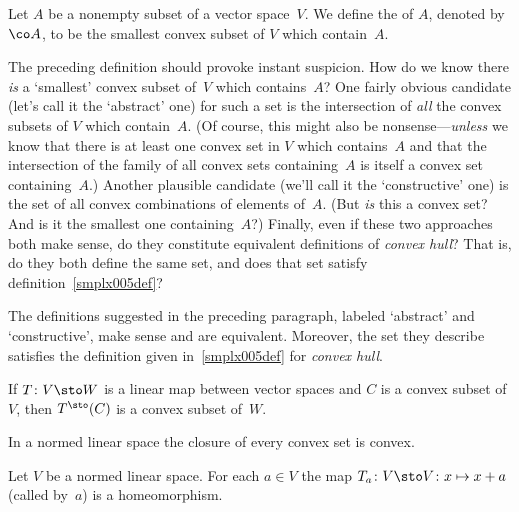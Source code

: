 \begin{defn}\label{smplx005def} Let $A$ be a nonempty subset of a vector space~$V$.  We define the
 of $A$, denoted by $\co A$, to be the smallest convex subset of $V$ which contain~$A$.
\end{defn}

The preceding definition should provoke instant suspicion.  How do we know there \emph{is} a `smallest' convex subset of~$V$
which contains~$A$?  One fairly obvious candidate (let's call it the `abstract' one) for such a set is the intersection
of \emph{all} the convex subsets of $V$ which contain~$A$.  (Of course, this might also be nonsense---\emph{unless} we know that there
is at least one convex set in $V$ which contains~$A$ and that the intersection of the family of all convex sets containing~$A$ is
itself a convex set containing~$A$.)  Another plausible candidate (we'll call it the `constructive' one) is the set of all convex
combinations of elements of~$A$.  (But \emph{is} this a convex set?  And is it the smallest one containing~$A$?)  Finally, even if these two
approaches both make sense, do they constitute equivalent definitions of \emph{convex hull}?  That is, do they both define the same set, and
does that set satisfy definition~\ref{smplx005def}?

\begin{prop}\label{smplx006} The definitions suggested in the preceding paragraph, labeled `abstract' and `constructive', make sense and
are equivalent.  Moreover, the set they describe satisfies the definition given in~\ref{smplx005def} for \emph{convex hull}.
\end{prop}

\begin{prop} If $T\colon V \sto W$ is a linear map between vector spaces and $C$ is a convex
subset of $V$, then $T^{\sto}(C)$ is a convex subset of~$W$.
\end{prop}

\begin{prop} In a normed linear space the closure of every convex set is convex.
\end{prop}

\begin{prop} Let $V$ be a normed linear space. For each $a \in V$ the map $T_a\colon V \sto V\colon x \mapsto x + a$ (called
 by~$a$) is a homeomorphism.
\end{prop}

